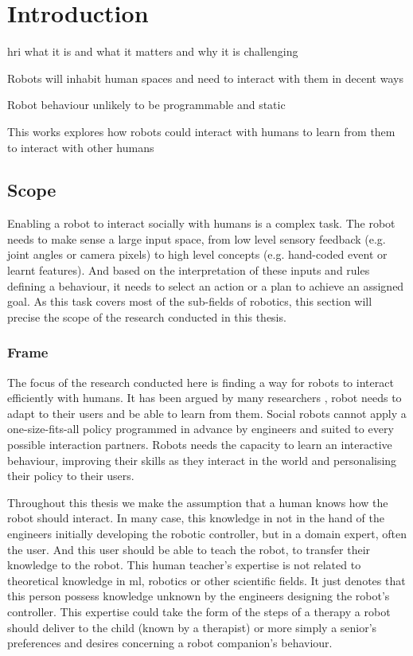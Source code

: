 \chapter{Introduction} \label{chap:intro}
\graphicspath{{images/intro/}}

\gls{hri} what it is and what it matters and why it is challenging

Robots will inhabit human spaces and need to interact with them in decent ways

Robot behaviour unlikely to be programmable and static

This works explores how robots could interact with humans to learn from them to interact with other humans

\section{Scope}\label{sec:intro-scope}

Enabling a robot to interact socially with humans is a complex task. The robot needs to make sense a large input space, from low level sensory feedback (e.g. joint angles or camera pixels) to high level concepts (e.g. hand-coded event or learnt features). And based on the interpretation of these inputs and rules defining a behaviour, it needs to select an action or a plan to achieve an assigned goal. As this task covers most of the sub-fields of robotics, this section will precise the scope of the research conducted in this thesis.

\subsection{Frame}

The focus of the research conducted here is finding a way for robots to interact efficiently with humans. It has been argued by many researchers  \citep{dautenhahn2004robots,billard2008robot}, robot needs to adapt to their users and be able to learn from them. Social robots cannot apply a one-size-fits-all policy programmed in advance by engineers and suited to every possible interaction partners. Robots needs the capacity to learn an interactive behaviour, improving their skills as they interact in the world and personalising their policy to their users.

Throughout this thesis we make the assumption that a human knows how the robot should interact. In many case, this knowledge in not in the hand of the engineers initially developing the robotic controller, but in a domain expert, often the user. And this user should be able to teach the robot, to transfer their knowledge to the robot. This human teacher's expertise is not related to theoretical knowledge in \gls{ml}, robotics or other scientific fields. It just denotes that this person possess knowledge unknown by the engineers designing the robot's controller. This expertise could take the form of the steps of a therapy a robot should deliver to the child (known by a therapist) or more simply a senior's preferences and desires concerning a robot companion's behaviour. 

